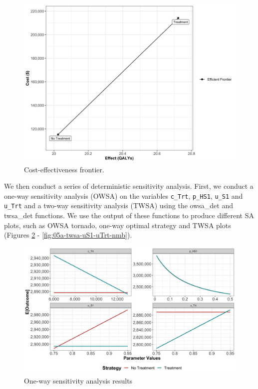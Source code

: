 \documentclass[]{book}
\begin{document}
\begin{figure}

{\centering \includegraphics[width=1\linewidth]{../figs/05a_cea_frontier} 

}

\caption{Cost-effectiveness frontier.}\label{fig:05a-CEA-frontier}
\end{figure}

We then conduct a series of deterministic sensitivity analysis. First, we conduct a one-way sensitivity analysis (OWSA) on the variables \texttt{c\_Trt}, \texttt{p\_HS1}, \texttt{u\_S1} and \texttt{u\_Trt} and a two-way sensitivity analysis (TWSA) using the owsa\_det and twsa\_det functions. We use the output of these functions to produce different SA plots, such as OWSA tornado, one-way optimal strategy and TWSA plots (Figures \ref{fig:05a-owsa-nmb} - \ref{fig:05a-twsa-uS1-uTrt-nmb}).

\begin{figure}

{\centering \includegraphics[width=1\linewidth]{../figs/05a_owsa_nmb} 

}

\caption{One-way sensitivity analysis results}\label{fig:05a-owsa-nmb}
\end{figure}
\end{document}
